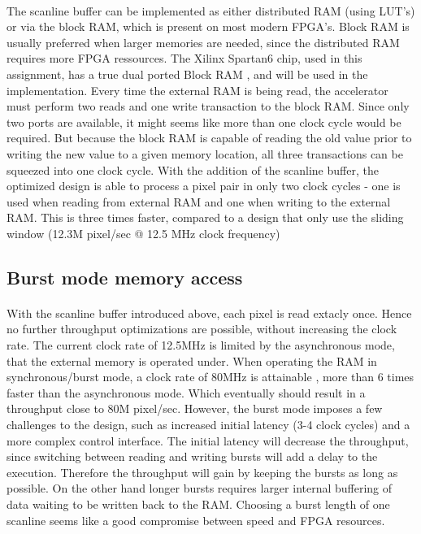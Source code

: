 \paragraph*{}
The scanline buffer can be implemented as either distributed RAM (using LUT's) or via the block RAM, which is present on most modern FPGA's. Block RAM is usually preferred when larger memories are needed, since the distributed RAM requires more FPGA ressources. The Xilinx Spartan6 chip, used in this assignment, has a true dual ported Block RAM \cite{Xilinx:UG383}, and will be used in the implementation.
Every time the external RAM is being read, the accelerator must perform two reads and one write transaction to the block RAM. Since only two ports are available, it might seems like more than one clock cycle would be required. But because the block RAM is capable of reading the old value prior to writing the new value to a given memory location, all three transactions can be squeezed into one clock cycle.
With the addition of the scanline buffer, the optimized design is able to process a pixel pair in only two clock cycles - one is used when reading from external RAM and one when writing to the external RAM. This is three times faster, compared to a design that only use the sliding window (12.3M pixel/sec @ 12.5 MHz clock frequency)

\subsection*{Burst mode memory access}
\label{sec:burstmode}
\paragraph*{}
With the scanline buffer introduced above, each pixel is read extacly once. Hence no further throughput optimizations are possible, without increasing the clock rate. The current clock rate of 12.5MHz is limited by the asynchronous mode, that the external memory is operated under. When operating the RAM in synchronous/burst mode, a clock rate of 80MHz is attainable \cite{Micron:CellularRAM}, more than 6 times faster than the asynchronous mode. Which eventually should result in a throughput close to 80M pixel/sec.
However, the burst mode imposes a few challenges to the design, such as increased initial latency (3-4 clock cycles) and a more complex control interface. The initial latency will decrease the throughput, since switching between reading and writing bursts will add a delay to the execution. Therefore the throughput will gain by keeping the bursts as long as possible. On the other hand longer bursts requires larger internal buffering of data waiting to be written back to the RAM. Choosing a burst length of one scanline seems like a good compromise between speed and FPGA resources.

